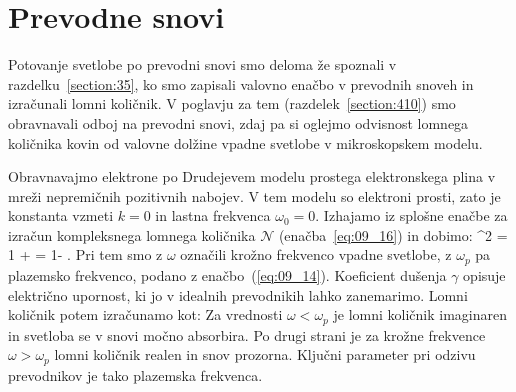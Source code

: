 \section{Prevodne snovi}
Potovanje svetlobe po prevodni snovi smo deloma že spoznali v 
razdelku~\ref{section:35}, ko smo zapisali valovno enačbo 
v prevodnih snoveh in izračunali lomni količnik.
V  poglavju za tem (razdelek~\ref{section:410}) 
smo obravnavali odboj na prevodni snovi, zdaj pa si oglejmo odvisnost
lomnega količnika kovin od valovne dolžine vpadne svetlobe v mikroskopskem
modelu.

Obravnavajmo elektrone po Drudejevem modelu prostega elektronskega plina
v mreži nepremičnih pozitivnih nabojev. V tem modelu so elektroni prosti,
zato je konstanta vzmeti $k=0$ in lastna frekvenca $\omega_0=0$. Izhajamo 
iz splošne enačbe za izračun kompleksnega lomnega količnika $\mathcal{N}$
(enačba~\ref{eq:09_16}) in dobimo:
\beq
{}^2 = 1 +  = 1- 
.
\label{eq:09_36}
\eeq
Pri tem smo z $\omega$ označili krožno frekvenco vpadne svetlobe, z
$\omega_p$ pa plazemsko frekvenco, podano z enačbo~(\ref{eq:09_14}). 
Koeficient dušenja $\gamma$ opisuje električno upornost, ki jo v idealnih 
prevodnikih lahko zanemarimo. Lomni količnik potem izračunamo kot:
Za vrednosti $\omega < \omega_p$ je lomni količnik imaginaren in svetloba se v snovi
močno absorbira. Po drugi strani je za krožne frekvence $\omega > \omega_p$ lomni količnik realen 
in snov prozorna. Ključni parameter pri odzivu prevodnikov je tako plazemska frekvenca. 


